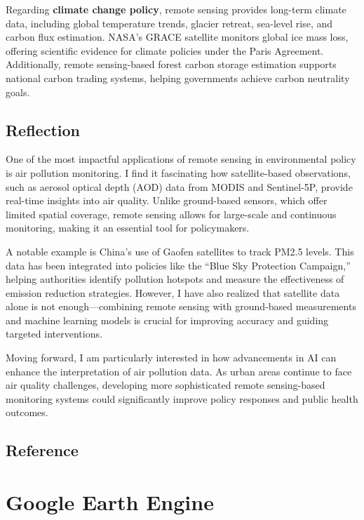 \documentclass[
  letterpaper,
]{scrbook}
\begin{document}
Regarding \textbf{climate change policy}, remote sensing provides
long-term climate data, including global temperature trends, glacier
retreat, sea-level rise, and carbon flux estimation. NASA's GRACE
satellite monitors global ice mass loss, offering scientific evidence
for climate policies under the Paris Agreement. Additionally, remote
sensing-based forest carbon storage estimation supports national carbon
trading systems, helping governments achieve carbon neutrality goals.

\section{Reflection}\label{reflection-2}

One of the most impactful applications of remote sensing in
environmental policy is air pollution monitoring. I find it fascinating
how satellite-based observations, such as aerosol optical depth (AOD)
data from MODIS and Sentinel-5P, provide real-time insights into air
quality. Unlike ground-based sensors, which offer limited spatial
coverage, remote sensing allows for large-scale and continuous
monitoring, making it an essential tool for policymakers.

A notable example is China's use of Gaofen satellites to track PM2.5
levels. This data has been integrated into policies like the ``Blue Sky
Protection Campaign,'' helping authorities identify pollution hotspots
and measure the effectiveness of emission reduction strategies. However,
I have also realized that satellite data alone is not enough---combining
remote sensing with ground-based measurements and machine learning
models is crucial for improving accuracy and guiding targeted
interventions.

Moving forward, I am particularly interested in how advancements in AI
can enhance the interpretation of air pollution data. As urban areas
continue to face air quality challenges, developing more sophisticated
remote sensing-based monitoring systems could significantly improve
policy responses and public health outcomes.

\section{Reference}\label{reference-2}


\chapter{Google Earth Engine}\label{google-earth-engine}
\end{document}
